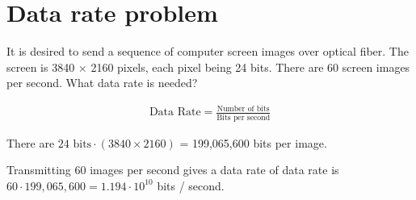 
\section{Data rate problem}
It is desired to send a sequence of computer screen images over optical fiber. The screen is 3840 $\times$ 2160 pixels, each pixel being 24 bits. There are 60 screen images per second. What data rate is needed?

\begin{align*}
	\text{Data Rate} = \frac{\text{Number of bits}}{\text{Bits per second}}
\end{align*}

There are $24 \text{ bits} \cdot (3840 \times 2160)$ = 199,065,600 bits per image. 

Transmitting 60 images per second gives a data rate of data rate is $60 \cdot 199,065,600 = 1.194 \cdot 10^{10}$ bits / second.

\section{}
\section{}
\section{}
\section{}
\section{}
\section{}
